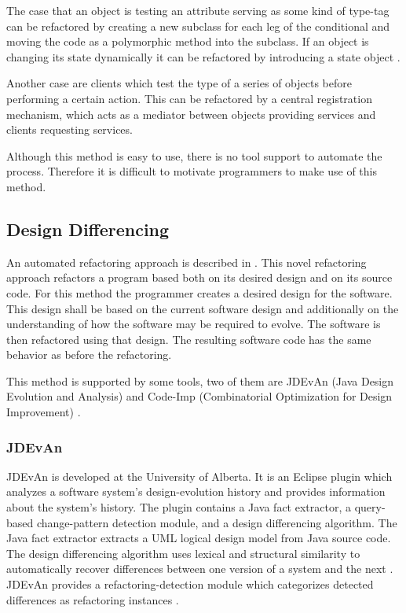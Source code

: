 \documentclass[conference,compsoc,a4paper]{IEEEtran}
\begin{document}
The case that an object is testing an attribute serving as some kind of type-tag can be refactored by creating a new 
subclass for each leg of the conditional and moving the code as a polymorphic method into the subclass. If an object is 
changing its state dynamically it can be refactored by introducing a state object \cite[pp.~305--313]{designpatterns}.

Another case are clients which test the type of a series of objects before performing a certain action. This can be 
refactored by a central registration mechanism, which acts as a mediator between objects providing services and clients 
requesting services.

Although this method is easy to use, there is no tool support to automate the process. Therefore it is difficult to 
motivate programmers to make use of this method.

\subsection{Design Differencing}

An automated refactoring approach is described in \cite{design-diff}. This novel refactoring approach refactors a 
program based both on its desired design and on	its source code.
For this method the programmer creates a desired design for the software. This design shall be based on the current 
software design and additionally on the understanding of how the software may be required to evolve. The software is 
then refactored using that design. The resulting software code has the same behavior as before the refactoring.

This method is supported by some tools, two of them are JDEvAn (Java Design Evolution and Analysis) \cite{JDEvAn} and 
Code-Imp (Combinatorial Optimization for Design Improvement) \cite{DBLP:journals/jss/OKeeffeC08, 
DBLP:conf/icse/MoghadamC11}.

\subsubsection{JDEvAn}

JDEvAn is developed at the University of Alberta. It is an Eclipse plugin which analyzes a software system's 
design-evolution history and provides information about the system's history. The plugin contains a Java fact 
extractor, a query-based change-pattern detection module, and a design differencing algorithm. The Java fact extractor 
extracts a UML logical design model from Java source code. The design differencing algorithm uses lexical and 
structural similarity to automatically recover differences between one version of a system and the next \cite{Xing2007}.
JDEvAn provides a refactoring-detection module which categorizes detected differences as refactoring instances 
\cite{DBLP:conf/wcre/XingS06}.
\end{document}
